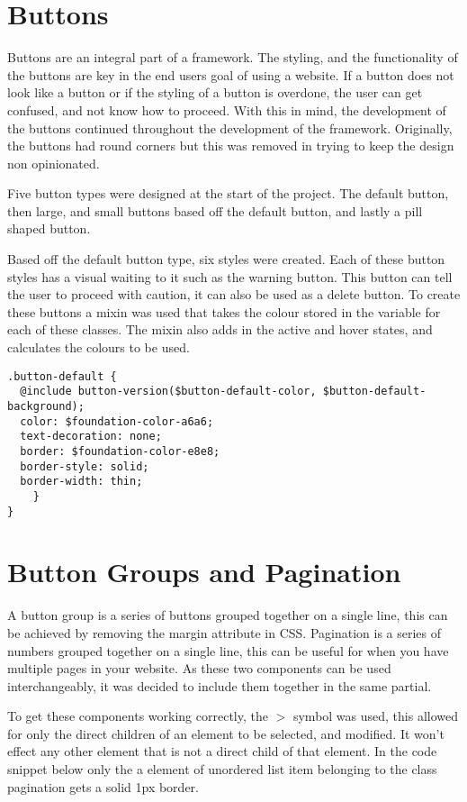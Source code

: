 \section*{Buttons}
Buttons are an integral part of a framework. The styling, and the functionality of the buttons are key in the end users goal of using a website. If a button does not look like a button or if the styling of a button is overdone, the user can get confused, and not know how to proceed. With this in mind, the development of the buttons continued throughout the development of the framework. Originally, the buttons had round corners but this was removed in trying to keep the design non opinionated. 

Five button types were designed at the start of the project. The default button, then large, and small buttons based off the default button, and lastly a pill shaped button. 

Based off the default button type, six styles were created. Each of these button styles has a visual waiting to it such as the warning button. This button can tell the user to proceed with caution, it can also be used as a delete button. To create these buttons a mixin was used that takes the colour stored in the variable for each of these classes. The mixin also adds in the active and hover states, and calculates the colours to be used. 

\begin{lstlisting}[language=CSS3]
.button-default {
  @include button-version($button-default-color, $button-default-background);
  color: $foundation-color-a6a6;
  text-decoration: none;
  border: $foundation-color-e8e8;
  border-style: solid;
  border-width: thin;
	}
}
\end{lstlisting}

\section*{Button Groups and Pagination}
A button group is a series of buttons grouped together on a single line, this can be achieved by removing the margin attribute in CSS. Pagination is a series of numbers grouped together on a single line, this can be useful for when you have multiple pages in your website. As these two components can be used interchangeably, it was decided to include them together in the same partial.

To get these components working correctly, the $>$ symbol was used, this allowed for only the direct children of an element to be selected, and modified. It won't effect any other element that is not a direct child of that element. In the code snippet below only the a element of unordered list item belonging to the class pagination gets a solid 1px border.   

